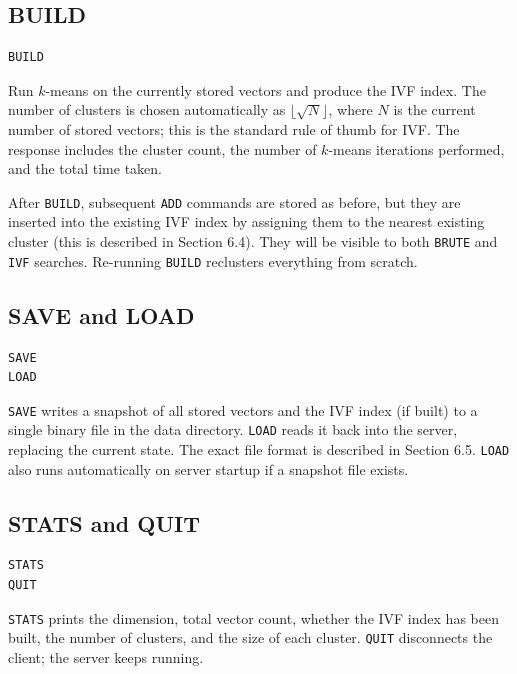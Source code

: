 \documentclass[11pt,a4paper]{article}
\begin{document}
\subsection{BUILD}
\begin{codebox}
\begin{lstlisting}
BUILD
\end{lstlisting}
\end{codebox}
Run $k$-means on the currently stored vectors and produce the IVF index. The number of clusters is chosen automatically as $\lfloor\sqrt{N}\rfloor$, where $N$ is the current number of stored vectors; this is the standard rule of thumb for IVF. The response includes the cluster count, the number of $k$-means iterations performed, and the total time taken.

After \texttt{BUILD}, subsequent \texttt{ADD} commands are stored as before, but they are inserted into the existing IVF index by assigning them to the nearest existing cluster (this is described in Section 6.4). They will be visible to both \texttt{BRUTE} and \texttt{IVF} searches. Re-running \texttt{BUILD} reclusters everything from scratch.

\subsection{SAVE and LOAD}
\begin{codebox}
\begin{lstlisting}
SAVE
LOAD
\end{lstlisting}
\end{codebox}
\texttt{SAVE} writes a snapshot of all stored vectors and the IVF index (if built) to a single binary file in the data directory. \texttt{LOAD} reads it back into the server, replacing the current state. The exact file format is described in Section 6.5. \texttt{LOAD} also runs automatically on server startup if a snapshot file exists.

\subsection{STATS and QUIT}
\begin{codebox}
\begin{lstlisting}
STATS
QUIT
\end{lstlisting}
\end{codebox}
\texttt{STATS} prints the dimension, total vector count, whether the IVF index has been built, the number of clusters, and the size of each cluster. \texttt{QUIT} disconnects the client; the server keeps running.
\end{document}
